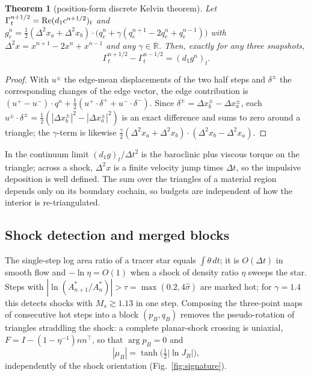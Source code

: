 \documentclass[11pt]{article}
\newtheorem{theorem}{Theorem}\newtheorem{proposition}{Proposition}\newtheorem{corollary}{Corollary}
\theoremstyle{definition}\newtheorem{definition}{Definition}\theoremstyle{remark}\newtheorem{remark}{Remark}
\begin{document}
\begin{theorem}[position-form discrete Kelvin theorem]\label{thm:kelvin}
Let $\Gamma_t^{n+1/2}=\operatorname{Re}(d_1c^{n+1/2})_t$ and $g^n_e=\frac12(\Delta^2x_a+\Delta^2x_b)\cdot\big(q_e^n+\gamma(q_e^{n+1}-2q_e^n+q_e^{n-1})\big)$ with $\Delta^2x=x^{n+1}-2x^n+x^{n-1}$ and any $\gamma\in\mathbb R$. Then, exactly for any three snapshots,
\begin{equation}
\Gamma_t^{n+1/2}-\Gamma_t^{n-1/2}=(d_1g^n)_t.
\end{equation}
\end{theorem}
\begin{proof}
With $u^\pm$ the edge-mean displacements of the two half steps and $\delta^\pm$ the corresponding changes of the edge vector, the edge contribution is $(u^+-u^-)\cdot q^n+\frac12(u^+\cdot\delta^++u^-\cdot\delta^-)$. Since $\delta^\pm=\Delta x_b^\pm-\Delta x_a^\pm$, each $u^\pm\cdot\delta^\pm=\frac12(|\Delta x_b^\pm|^2-|\Delta x_a^\pm|^2)$ is an exact difference and sums to zero around a triangle; the $\gamma$-term is likewise $\frac\gamma2(\Delta^2x_a+\Delta^2x_b)\cdot(\Delta^2x_b-\Delta^2x_a)$.
\end{proof}
In the continuum limit $(d_1g)_t/\Delta t^2$ is the baroclinic plus viscous torque on the triangle; across a shock, $\Delta^2x$ is a finite velocity jump times $\Delta t$, so the impulsive deposition is well defined. The sum over the triangles of a material region depends only on its boundary cochain, so budgets are independent of how the interior is re-triangulated.

\subsection{Shock detection and merged blocks}\label{sec:shock}
The single-step log area ratio of a tracer star equals $\int\theta\,dt$; it is $O(\Delta t)$ in smooth flow and $-\ln\eta=O(1)$ when a shock of density ratio $\eta$ sweeps the star. Steps with $|\ln(A^\ast_{n+1}/A^\ast_n)|>\tau=\max(0.2,4\hat\sigma)$ are marked hot; for $\gamma=1.4$ this detects shocks with $M_s\gtrsim1.13$ in one step. Composing the three-point maps of consecutive hot steps into a block $(p_B,q_B)$ removes the pseudo-rotation of triangles straddling the shock: a complete planar-shock crossing is uniaxial, $F=I-(1-\eta^{-1})nn^\top$, so that $\arg p_B=0$ and
\begin{equation}
|\mu_B|=\tanh\big(\tfrac12|\ln J_B|\big),
\end{equation}
independently of the shock orientation (Fig.~\ref{fig:signature}).
\end{document}
